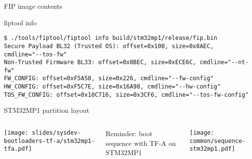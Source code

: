 \begin{frame}[fragile]{FIP image contents}
  \begin{block}{fiptool info}
    {\footnotesize
\begin{verbatim}
$ ./tools/fiptool/fiptool info build/stm32mp1/release/fip.bin
Secure Payload BL32 (Trusted OS): offset=0x100, size=0x8AEC, cmdline="--tos-fw"
Non-Trusted Firmware BL33: offset=0x8BEC, size=0xECE6C, cmdline="--nt-fw"
FW_CONFIG: offset=0xF5A58, size=0x226, cmdline="--fw-config"
HW_CONFIG: offset=0xF5C7E, size=0x16A98, cmdline="--hw-config"
TOS_FW_CONFIG: offset=0x10C716, size=0x3CF6, cmdline="--tos-fw-config"
\end{verbatim}
    }
  \end{block}
\end{frame}

\begin{frame}{STM32MP1 partition layout}
  \begin{columns}
  \begin{center}
    \texttt{[image: slides/sysdev-bootloaders-tf-a/stm32mp1-tfa.pdf]}
  \end{center}
  \small Reminder: boot sequence with TF-A on STM32MP1
  \begin{center}
    \texttt{[image: common/sequence-stm32mp1.pdf]}
  \end{center}
  \end{columns}
\end{frame}
